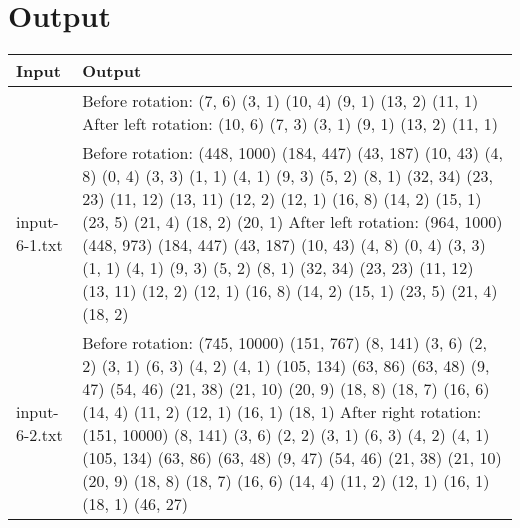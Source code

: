 \documentclass[11pt]{article}
\begin{document}
\section*{Output}
\begin{center}
\begin{tabular}{|p{10em}|p{30em}|} 
\hline
\textbf{Input} & \textbf{Output} \\ 
\hline
[7, 10, 3, 9, 13, 11] & Before rotation: (7, 6) (3, 1) (10, 4) (9, 1) (13, 2) (11, 1) \newline After left rotation: (10, 6) (7, 3) (3, 1) (9, 1) (13, 2) (11, 1) \\ 
\hline 
input-6-1.txt & Before rotation: (448, 1000) (184, 447) (43, 187) (10, 43) (4, 8) (0, 4) (3, 3) (1, 1) (4, 1) (9, 3) (5, 2) (8, 1) (32, 34) (23, 23) (11, 12) (13, 11) (12, 2) (12, 1) (16, 8) (14, 2) (15, 1) (23, 5) (21, 4) (18, 2) (20, 1) \newline After left rotation: (964, 1000) (448, 973) (184, 447) (43, 187) (10, 43) (4, 8) (0, 4) (3, 3) (1, 1) (4, 1) (9, 3) (5, 2) (8, 1) (32, 34) (23, 23) (11, 12) (13, 11) (12, 2) (12, 1) (16, 8) (14, 2) (15, 1) (23, 5) (21, 4) (18, 2) \\ 
\hline 
input-6-2.txt & Before rotation: (745, 10000) (151, 767) (8, 141) (3, 6) (2, 2) (3, 1) (6, 3) (4, 2) (4, 1) (105, 134) (63, 86) (63, 48) (9, 47) (54, 46) (21, 38) (21, 10) (20, 9) (18, 8) (18, 7) (16, 6) (14, 4) (11, 2) (12, 1) (16, 1) (18, 1) \newline After right rotation: (151, 10000) (8, 141) (3, 6) (2, 2) (3, 1) (6, 3) (4, 2) (4, 1) (105, 134) (63, 86) (63, 48) (9, 47) (54, 46) (21, 38) (21, 10) (20, 9) (18, 8) (18, 7) (16, 6) (14, 4) (11, 2) (12, 1) (16, 1) (18, 1) (46, 27) \\ 
\hline
\end{tabular}
\end{center}

\pagebreak
\end{document}
